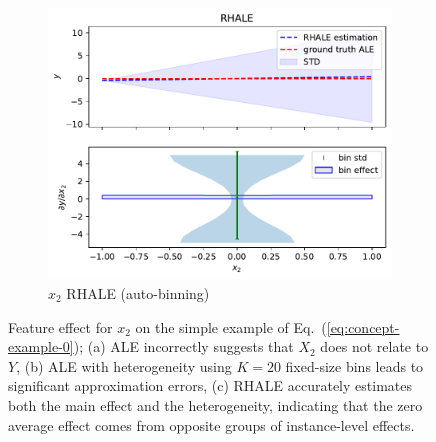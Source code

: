 \documentclass{ecai}  %
\begin{document}
\begin{figure}
\begin{subfigure}{.33\textwidth}
  \centering
  \includegraphics[width=1\textwidth]{concept_figure_0/rhale_N_100_feat_1}
  \caption{\(x_2\) RHALE (auto-binning)}
  \label{fig:concept-figure-0-subfig-3}
\end{subfigure}
\caption{Feature effect for \(x_2\) on the simple example of Eq.~(\ref{eq:concept-example-0}); (a) ALE incorrectly suggests that \(X_2\) does not relate to \(Y\), (b) ALE with heterogeneity using \(K=20\) fixed-size bins leads to significant approximation errors, (c) RHALE accurately estimates both the main effect and the heterogeneity, indicating that the zero average effect comes from opposite groups of instance-level effects.}
\label{fig:concept-figure-0}
\end{figure}
\end{document}
